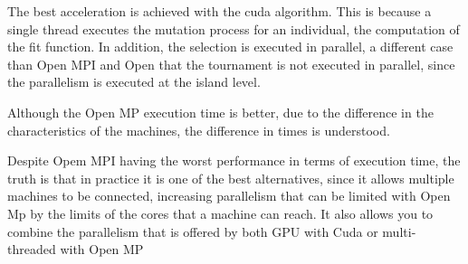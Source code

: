 \documentclass{IEEEtran}
\begin{document}
The best acceleration is achieved with the cuda algorithm. This is because a single thread executes the mutation process for an individual, the computation of the fit function. In addition, the selection is executed in parallel, a different case than Open MPI and Open that the tournament is not executed in parallel, since the parallelism is executed at the island level.

Although the Open MP execution time is better, due to the difference in the characteristics of the machines, the difference in times is understood.

Despite Opem MPI having the worst performance in terms of execution time, the truth is that in practice it is one of the best alternatives, since it allows multiple machines to be connected, increasing parallelism that can be limited with Open Mp by the limits of the cores that a machine can reach. It also allows you to combine the parallelism that is offered by both GPU with Cuda or multi-threaded with Open MP






\end{document}
